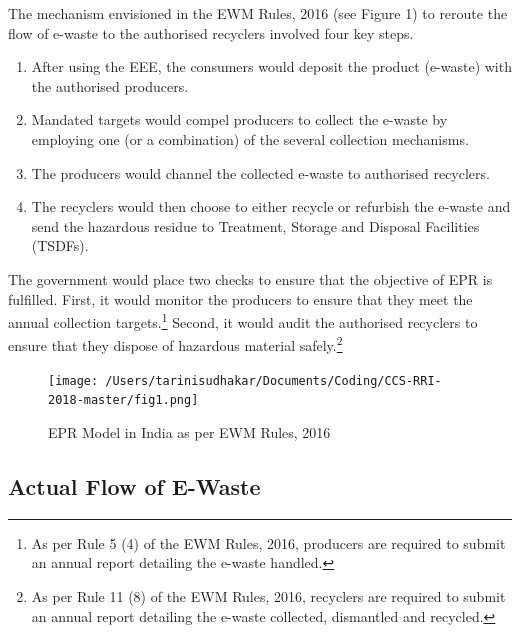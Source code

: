 \documentclass[a4paper, 12pt]{article}
\begin{document}
                    The mechanism envisioned in the EWM Rules, 2016 (see Figure 1) to reroute the flow of e-waste to the authorised recyclers involved four key steps.                     
                    \begin{enumerate}
                      \item After using the EEE, the consumers would deposit the product (e-waste) with the authorised producers.
                      \item Mandated targets would compel producers to collect the e-waste by employing one (or a combination) of the several collection mechanisms. 
                      \item The producers would channel the collected e-waste to authorised recyclers.
                      \item The recyclers would then choose to either recycle or refurbish the e-waste and send the hazardous residue to Treatment, Storage and Disposal Facilities (TSDFs).
                    \end{enumerate}
                    
                    The government would place two checks to ensure that the objective of EPR is fulfilled. First, it would monitor the producers to ensure that they meet the annual collection targets.\footnote{As per Rule 5 (4) of the EWM Rules, 2016, producers are required to submit an annual report detailing the e-waste handled.} Second, it would audit the authorised recyclers to ensure that they dispose of hazardous material safely.\footnote{As per Rule 11 (8) of the EWM Rules, 2016, recyclers are required to submit an annual report detailing the e-waste collected, dismantled and recycled.}\\
                    
                    \begin{figure}[H]
                    	\centering
                    	\texttt{[image: /Users/tarinisudhakar/Documents/Coding/CCS-RRI-2018-master/fig1.png]}
                    	\caption[Optional Caption]{EPR Model in India as per EWM Rules, 2016}
                    \end{figure}
                    
                    \subsection{Actual Flow of E-Waste}
                    
\end{document}
